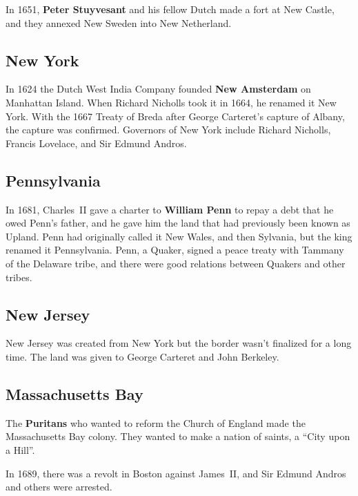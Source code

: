 In 1651, \textbf{Peter Stuyvesant} and his fellow Dutch made a fort at New Castle,
and they annexed New Sweden into New Netherland.

\subsection*{New York}

In 1624 the Dutch West India Company founded \textbf{New Amsterdam} on Manhattan Island.
When Richard Nicholls took it in 1664, he renamed it New York.
With the 1667 Treaty of Breda after George Carteret's capture of Albany,
the capture was confirmed.
Governors of New York include Richard Nicholls, Francis Lovelace, and Sir Edmund Andros.

\subsection*{Pennsylvania}

In 1681, Charles~II gave a charter to \textbf{William Penn} to repay a debt that he owed Penn's father,
and he gave him the land that had previously been known as Upland.
Penn had originally called it New Wales, and then Sylvania, but the king renamed it Pennsylvania.
Penn, a Quaker, signed a peace treaty with Tammany of the Delaware tribe,
and there were good relations between Quakers and other tribes.

\subsection*{New Jersey}

New Jersey was created from New York but the border wasn't finalized for a long time.
The land was given to George Carteret and John Berkeley.

\subsection*{Massachusetts Bay}

The \textbf{Puritans} who wanted to reform the Church of England made the Massachusetts Bay colony.
They wanted to make a nation of saints, a ``City upon a Hill''.

In 1689, there was a revolt in Boston against James~II, and Sir Edmund Andros and others were arrested.


